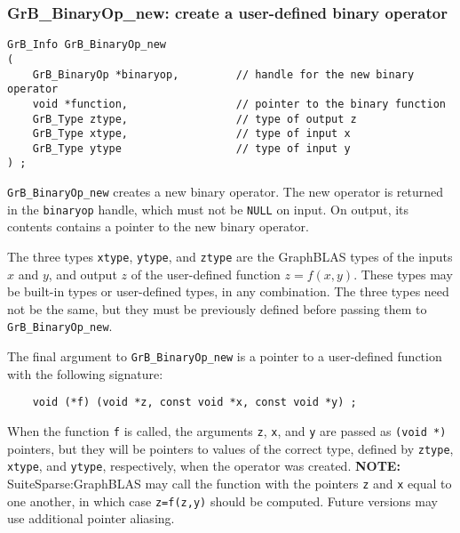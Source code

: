 \documentclass[12pt]{article}
\begin{document}
\newpage
\subsubsection{{\sf GrB\_BinaryOp\_new:} create a user-defined binary operator}
\label{binaryop_new}

\begin{mdframed}[userdefinedwidth=6in]
{\footnotesize
\begin{verbatim}
GrB_Info GrB_BinaryOp_new
(
    GrB_BinaryOp *binaryop,         // handle for the new binary operator
    void *function,                 // pointer to the binary function
    GrB_Type ztype,                 // type of output z
    GrB_Type xtype,                 // type of input x
    GrB_Type ytype                  // type of input y
) ;
\end{verbatim}
}\end{mdframed}

\verb'GrB_BinaryOp_new' creates a new binary operator.  The new operator is
returned in the \verb'binaryop' handle, which must not be \verb'NULL' on input.
On output, its contents contains a pointer to the new binary operator.

The three types \verb'xtype', \verb'ytype', and \verb'ztype' are the GraphBLAS
types of the inputs $x$ and $y$, and output $z$ of the user-defined function
$z=f(x,y)$.  These types may be built-in types or user-defined types, in any
combination.  The three types need not be the same, but they must be previously
defined before passing them to \verb'GrB_BinaryOp_new'.

The final argument to \verb'GrB_BinaryOp_new' is a pointer to a user-defined
function with the following signature:

    {\footnotesize
    \begin{verbatim}
    void (*f) (void *z, const void *x, const void *y) ; \end{verbatim} }

When the function \verb'f' is called, the arguments \verb'z', \verb'x', and
\verb'y' are passed as \verb'(void *)' pointers, but they will be pointers to
values of the correct type, defined by \verb'ztype', \verb'xtype', and
\verb'ytype', respectively, when the operator was created.
{\bf NOTE:} SuiteSparse:GraphBLAS may call the function with the pointers
\verb'z' and \verb'x' equal to one another, in which case \verb'z=f(z,y)'
should be computed.  Future versions may use additional pointer aliasing.
\end{document}
